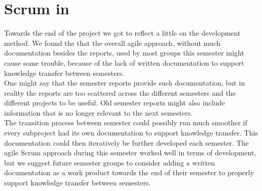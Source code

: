 
\section{Scrum in \giraf}

Towards the end of the project we got to reflect a little on the \giraf development method. We found the that the overall agile approach, without much documentation besides the reports, used by most groups this semester might cause some trouble, because of the lack of written documentation to support knowledge transfer between semesters. \\

One might say that the semester reports provide such documentation, but in reality the reports are too scattered across the different semesters and the different projects to be useful. Old semester reports might also include information that is no longer relevant to the next semesters. \\

The transition process between semester could possibly run much smoother if every subproject had its own documentation to support knowledge transfer. This documentation could then iteratively be further developed each semester. The agile Scrum approach during this semester worked well in terms of development, but we suggest future semester groups to consider adding a written documentation as a work product towards the end of their semester to properly support knowledge transfer between semesters.